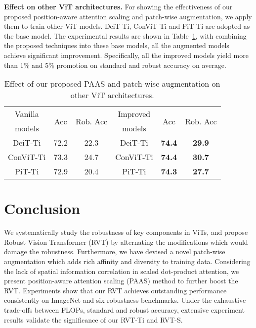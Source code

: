 \documentclass[10pt,twocolumn,letterpaper]{article}
\newcommand{\tablestyle}[2]{\setlength{\tabcolsep}{#1}\renewcommand{\arraystretch}{#2}\centering\footnotesize}
\begin{document}
\textbf{Effect on other ViT architectures.}
For showing the effectiveness of our proposed position-aware attention scaling and patch-wise augmentation, we apply them to train other ViT models. DeiT-Ti, ConViT-Ti and PiT-Ti are adopted as the base model. The experimental results are shown in Table~\ref{ablate:3}, with combining the proposed techniques into these base models, all the augmented models achieve significant improvement. Specifically, all the improved models yield more than 1\% and 5\% promotion on standard and robust accuracy on average.

\begin{table}[h!]
	\vspace{-5pt}
    \small
    \centering
     \tablestyle{5pt}{1.05}
\begin{tabular}{c|c|c|c|c|c}
\toprule

Vanilla & \multirow{2}{*}{Acc} & \multirow{2}{*}{Rob. Acc} & Improved & \multirow{2}{*}{Acc} & \multirow{2}{*}{Rob. Acc} \\
models &  &  & models & &  \\
\midrule
DeiT-Ti & 72.2 & 22.3 & DeiT-Ti & \textbf{74.4} & \textbf{29.9} \\
ConViT-Ti & 73.3 & 24.7 & ConViT-Ti & \textbf{74.4} & \textbf{30.7} \\
PiT-Ti & 72.9 & 20.4 & PiT-Ti & \textbf{74.3} & \textbf{27.7} \\
\bottomrule
\end{tabular}

\caption{Effect of our proposed PAAS and patch-wise augmentation on other ViT architectures.}
\label{ablate:3}
\vspace{-10pt}
\end{table}

\section{Conclusion}

We systematically study the robustness of key components in ViTs, and propose Robust Vision Transformer (RVT) by alternating the modifications which would damage the robustness. Furthermore, we have devised a novel patch-wise augmentation which adds rich affinity and diversity to training data. Considering the lack of spatial information correlation in scaled dot-product attention, we present position-aware attention scaling (PAAS) method to further boost the RVT. Experiments show that our RVT achieves outstanding performance consistently on ImageNet and six robustness benchmarks. Under the exhaustive trade-offs between FLOPs, standard and robust accuracy, extensive experiment results validate the significance of our RVT-Ti and RVT-S.
\end{document}
